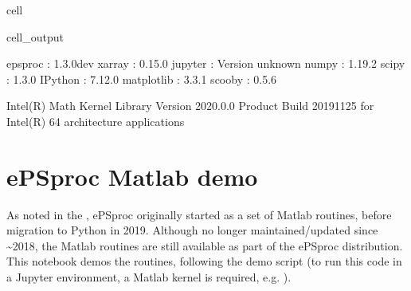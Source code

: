 \documentclass[letterpaper,10pt,english]{jupyterBook}
\begin{document}
\begin{sphinxuseclass}{cell}
\begin{sphinxVerbatimOutput}
\begin{sphinxuseclass}{cell_output}
\begin{sphinxVerbatim}[commandchars=\\\{\}]
           epsproc : 1.3.0\PYGZhy{}dev
            xarray : 0.15.0
           jupyter : Version unknown
             numpy : 1.19.2
             scipy : 1.3.0
           IPython : 7.12.0
        matplotlib : 3.3.1
            scooby : 0.5.6

  Intel(R) Math Kernel Library Version 2020.0.0 Product Build 20191125 for
  Intel(R) 64 architecture applications
\PYGZhy{}\PYGZhy{}\PYGZhy{}\PYGZhy{}\PYGZhy{}\PYGZhy{}\PYGZhy{}\PYGZhy{}\PYGZhy{}\PYGZhy{}\PYGZhy{}\PYGZhy{}\PYGZhy{}\PYGZhy{}\PYGZhy{}\PYGZhy{}\PYGZhy{}\PYGZhy{}\PYGZhy{}\PYGZhy{}\PYGZhy{}\PYGZhy{}\PYGZhy{}\PYGZhy{}\PYGZhy{}\PYGZhy{}\PYGZhy{}\PYGZhy{}\PYGZhy{}\PYGZhy{}\PYGZhy{}\PYGZhy{}\PYGZhy{}\PYGZhy{}\PYGZhy{}\PYGZhy{}\PYGZhy{}\PYGZhy{}\PYGZhy{}\PYGZhy{}\PYGZhy{}\PYGZhy{}\PYGZhy{}\PYGZhy{}\PYGZhy{}\PYGZhy{}\PYGZhy{}\PYGZhy{}\PYGZhy{}\PYGZhy{}\PYGZhy{}\PYGZhy{}\PYGZhy{}\PYGZhy{}\PYGZhy{}\PYGZhy{}\PYGZhy{}\PYGZhy{}\PYGZhy{}\PYGZhy{}\PYGZhy{}\PYGZhy{}\PYGZhy{}\PYGZhy{}\PYGZhy{}\PYGZhy{}\PYGZhy{}\PYGZhy{}\PYGZhy{}\PYGZhy{}\PYGZhy{}\PYGZhy{}\PYGZhy{}\PYGZhy{}\PYGZhy{}\PYGZhy{}\PYGZhy{}\PYGZhy{}\PYGZhy{}\PYGZhy{}
\end{sphinxVerbatim}

\end{sphinxuseclass}\end{sphinxVerbatimOutput}

\end{sphinxuseclass}
\sphinxstepscope


\chapter{ePSproc Matlab demo}
\label{\detokenize{testChpt/ePSproc_Matlab_demo_notebook_090821:epsproc-matlab-demo}}\label{\detokenize{testChpt/ePSproc_Matlab_demo_notebook_090821::doc}}
\sphinxAtStartPar
As noted in the , ePSproc originally started as a set of Matlab routines, before migration to Python in 2019. Although no longer maintained/updated since \textasciitilde{}2018, the Matlab routines are still available as part of the ePSproc distribution. This notebook demos the routines, following the demo script  (to run this code in a Jupyter environment, a Matlab kernel is required, e.g. ).
\end{document}
